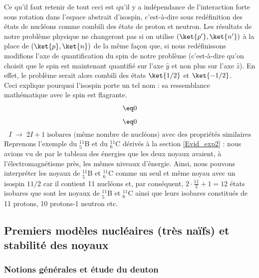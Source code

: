 Ce qu'il faut retenir de tout ceci est qu'il y a indépendance de l'interaction forte sous rotation dans l'espace abstrait d'isospin, c'est-à-dire sous redéfinition des états de nucléons comme combili des états de proton et neutron. Les résultats de notre problème physique ne changeront pas si on utilise $(\ket{p'},\ket{n'})$ à la place de $(\ket{p},\ket{n})$ de la même façon que, si nous redéfinissons modifions l'axe de quantification du spin de notre problème (c'est-à-dire qu'on choisit que le spin est maintenant quantifié sur l'axe $\hat{y}$ et non plus sur l'axe $\hat{z}$). En effet, le problème serait alors combili des états $\ket{1/2}$ et $\ket{-1/2}$.\\
Ceci explique pourquoi l'isospin porte un tel nom : sa ressemblance mathématique avec le spin est flagrante.\\
\begin{equation*}
    [I_z,H] \eq 0
\end{equation*}
\begin{equation*}
    [I^2,H] \eq 0
\end{equation*}
\begin{equation*}
    I \; \longrightarrow\; 2I+1 \; \text{isobares (même nombre de nucléons) avec des propriétés similaires}
\end{equation*}
Reprenons l'exemple du $^{11}_5$B et du $^{11}_6$C dérivés à la section \ref{Evid_exp2} : nous avions vu de par le tableau des énergies que les deux noyaux avaient, à l'électromagnétisme près, les mêmes niveaux d'énergie. Ainsi, nous pouvons interpréter les noyaux de $^{11}_5$B et $^{11}_6$C comme un seul et même noyau avec un isospin $11/2$ car il contient 11 nucléons et, par conséquent, $2\cdot\frac{11}{2}+1 = 12$ états isobares que sont les noyaux de $^{11}_5$B et $^{11}_6$C ainsi que leurs isobares constitués de 11 protons, 10 protons-1 neutron etc.








\subsection{Premiers modèles nucléaires (très naïfs) et stabilité des noyaux}
\subsubsection{Notions générales et étude du deuton}


